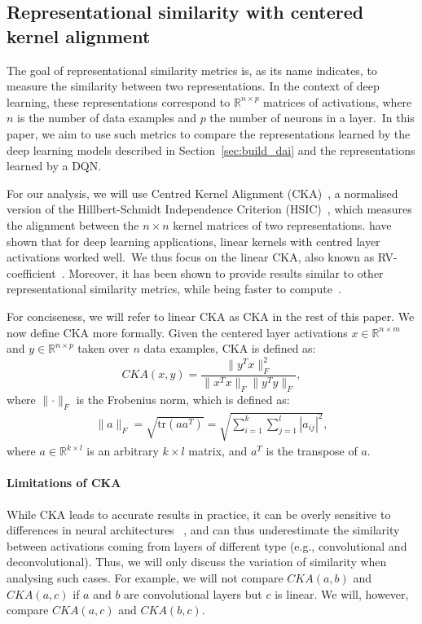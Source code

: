 \documentclass[twoside,11pt]{article}
\begin{document}
\subsection{Representational similarity with centered kernel alignment}\label{ssec:similarity}
The goal of representational similarity metrics is, as its name indicates, to measure the similarity between two representations.
In the context of deep learning, these representations correspond to $\mathbb{R}^{n \times p}$ matrices of activations, where
$n$ is the number of data examples and $p$ the number of neurons in a layer.~In this paper, we aim to use such metrics to compare the representations learned by the deep learning models described in Section~\ref{sec:build_dai} and the
representations learned by a DQN.

For our analysis, we will use Centred Kernel Alignment (CKA)~\citep{Cortes2012,Cristianini2002}, a normalised version of the Hillbert-Schmidt Independence Criterion (HSIC)~\citep{Gretton2005}, which measures the alignment between the $n \times n$ kernel matrices of two representations. \citet{Kornblith2019} have shown that for deep learning applications, linear kernels with centred layer activations worked well.~We thus focus on the linear CKA, also known as RV-coefficient~\citep{Robert1976}. Moreover, it has been shown to provide results similar to other representational similarity metrics, while being faster to compute~\citep{Bonheme2022}.

For conciseness, we will refer to linear CKA as CKA in the rest of this paper.
We now define CKA more formally. Given the centered layer activations $x \in \mathbb{R}^{n \times m}$ and $y \in \mathbb{R}^{n \times p}$ taken over $n$ data examples, CKA is defined as:
\begin{equation*}
    CKA(x, y) = \frac{\lVert y^Tx \rVert_F^2}{\lVert x^Tx \rVert_F\lVert y^Ty \rVert_F},
\end{equation*}
where $\lVert{\cdot}\rVert_F$ is the Frobenius norm, which is defined as:
\begin{align*}
\lVert{a}\rVert_F = \sqrt{\text{tr}(aa^T)} = \sqrt{\sum_{i=1}^k\sum_{j=1}^l |a_{ij}|^2},
\end{align*}
where $a \in \mathbb{R}^{k\times l}$ is an arbitrary $k \times l$ matrix, and $a^T$ is the transpose of $a$.

\paragraph{Limitations of CKA}
While CKA leads to accurate results in practice, it can be overly sensitive to differences in neural architectures ~\citet{Maheswaranathan2019}, and can thus underestimate the similarity between activations coming from layers of different type (e.g., convolutional and deconvolutional). Thus, we will only discuss the variation of similarity when analysing such cases.
For example, we will not compare $CKA(a, b)$ and $CKA(a, c)$ if $a$ and $b$ are convolutional layers but
$c$ is linear. We will, however, compare $CKA(a, c)$ and $CKA(b, c)$.
\end{document}
